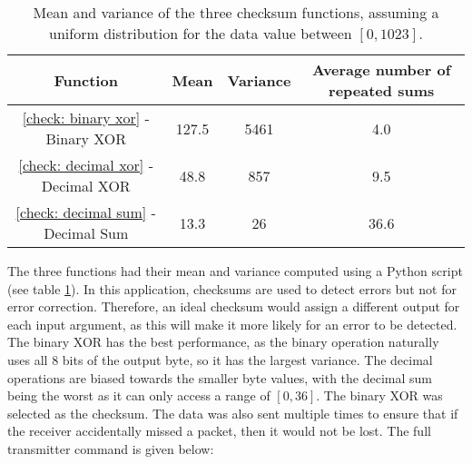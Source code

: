 \begin{table}[ht]
	\begin{center}
	\caption{Mean and variance of the three checksum functions, assuming a uniform distribution for the data value between $[0,1023]$.}
	\label{tab: checksums}
	\begin{tabular}{|c|c|c|c|}
		\hline
		\textbf{Function} & \textbf{Mean} & \textbf{Variance} & \textbf{Average number of repeated sums}\\
		\hline
		\ref{check: binary xor} - Binary XOR & 127.5 & 5461 & 4.0\\
		\ref{check: decimal xor} - Decimal XOR & 48.8 & 857 & 9.5\\
		\ref{check: decimal sum} - Decimal Sum & 13.3 & 26 & 36.6\\
		\hline
	\end{tabular}
	\end{center}
\end{table}

The three functions had their mean and variance computed using a Python script (see table \ref{tab: checksums}). In this application, checksums are used to detect errors but not for error correction. Therefore, an ideal checksum would assign a different output for each input argument, as this will make it more likely for an error to be detected. The binary XOR has the best performance, as the binary operation naturally uses all 8 bits of the output byte, so it has the largest variance. The decimal operations are biased towards the smaller byte values, with the decimal sum being the worst as it can only access a range of $[0,36]$. The binary XOR was selected as the checksum. The data was also sent multiple times to ensure that if the receiver accidentally missed a packet, then it would not be lost. The full transmitter command is given below:


